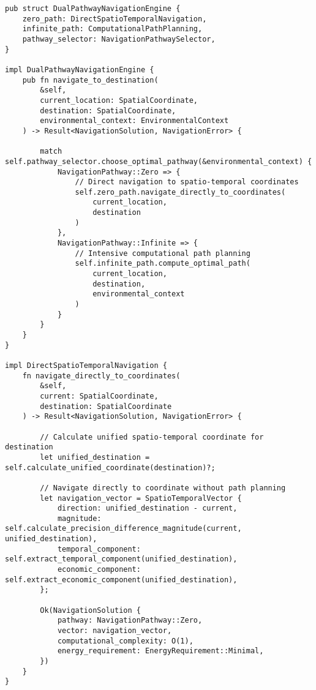 \documentclass[12pt,a4paper]{article}
\begin{document}
\begin{lstlisting}[style=ruststyle, caption=Dual Pathway Navigation Engine]
pub struct DualPathwayNavigationEngine {
    zero_path: DirectSpatioTemporalNavigation,
    infinite_path: ComputationalPathPlanning,
    pathway_selector: NavigationPathwaySelector,
}

impl DualPathwayNavigationEngine {
    pub fn navigate_to_destination(
        &self,
        current_location: SpatialCoordinate,
        destination: SpatialCoordinate,
        environmental_context: EnvironmentalContext
    ) -> Result<NavigationSolution, NavigationError> {
        
        match self.pathway_selector.choose_optimal_pathway(&environmental_context) {
            NavigationPathway::Zero => {
                // Direct navigation to spatio-temporal coordinates
                self.zero_path.navigate_directly_to_coordinates(
                    current_location,
                    destination
                )
            },
            NavigationPathway::Infinite => {
                // Intensive computational path planning
                self.infinite_path.compute_optimal_path(
                    current_location,
                    destination,
                    environmental_context
                )
            }
        }
    }
}

impl DirectSpatioTemporalNavigation {
    fn navigate_directly_to_coordinates(
        &self,
        current: SpatialCoordinate,
        destination: SpatialCoordinate
    ) -> Result<NavigationSolution, NavigationError> {
        
        // Calculate unified spatio-temporal coordinate for destination
        let unified_destination = self.calculate_unified_coordinate(destination)?;
        
        // Navigate directly to coordinate without path planning
        let navigation_vector = SpatioTemporalVector {
            direction: unified_destination - current,
            magnitude: self.calculate_precision_difference_magnitude(current, unified_destination),
            temporal_component: self.extract_temporal_component(unified_destination),
            economic_component: self.extract_economic_component(unified_destination),
        };
        
        Ok(NavigationSolution {
            pathway: NavigationPathway::Zero,
            vector: navigation_vector,
            computational_complexity: O(1),
            energy_requirement: EnergyRequirement::Minimal,
        })
    }
}
\end{lstlisting}
\end{document}
